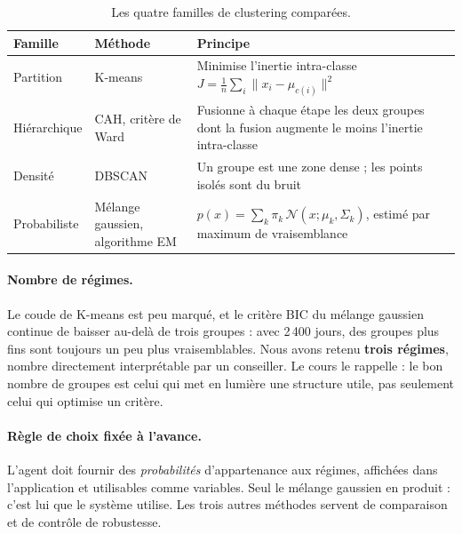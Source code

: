 \begin{table}[!htb]
  \centering
  \small
  \caption{Les quatre familles de clustering comparées.}
  \label{tab:clustering_methodes}
  \begin{tabularx}{\textwidth}{@{}l l L@{}}
    \toprule
    \textbf{Famille} & \textbf{Méthode} & \textbf{Principe} \\
    \midrule
    Partition & K-means & Minimise l'inertie intra-classe $J = \frac{1}{n}\sum_i \lVert x_i - \mu_{c(i)}\rVert^2$ \\
    Hiérarchique & CAH, critère de Ward~\cite{ward1963} & Fusionne à chaque étape les deux groupes dont la fusion augmente le moins l'inertie intra-classe \\
    Densité & DBSCAN~\cite{ester1996} & Un groupe est une zone dense ; les points isolés sont du bruit \\
    Probabiliste & Mélange gaussien, algorithme EM~\cite{dempster1977} & $p(x) = \sum_k \pi_k\,\mathcal{N}(x;\mu_k,\Sigma_k)$, estimé par maximum de vraisemblance \\
    \bottomrule
  \end{tabularx}
\end{table}

\paragraph{Nombre de régimes.} Le coude de K-means est peu marqué, et le critère BIC du mélange gaussien continue de baisser au-delà de trois groupes : avec 2\,400 jours, des groupes plus fins sont toujours un peu plus vraisemblables. Nous avons retenu \textbf{trois régimes}, nombre directement interprétable par un conseiller. Le cours le rappelle : le bon nombre de groupes est celui qui met en lumière une structure utile, pas seulement celui qui optimise un critère.

\paragraph{Règle de choix fixée à l'avance.} L'agent doit fournir des \emph{probabilités} d'appartenance aux régimes, affichées dans l'application et utilisables comme variables. Seul le mélange gaussien en produit : c'est lui que le système utilise. Les trois autres méthodes servent de comparaison et de contrôle de robustesse.

